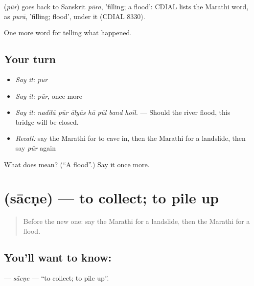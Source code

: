 \begin{cousinweb}
\textbf{} (\emph{pūr}) goes back to Sanskrit \emph{pūra}, 'filling; a flood': CDIAL lists the Marathi word, as \emph{purā}, 'filling; flood', under it (CDIAL 8330).
\end{cousinweb}

\begin{grammarlens}[title={What you've built}]
One more word for telling what happened.
\end{grammarlens}

\subsection*{Your turn}
\begin{itemize}
\raggedright
  \item \emph{Say it:} \emph{pūr}
  \item \emph{Say it:} \emph{pūr}, once more
  \item \emph{Say it:} \emph{nadīlā pūr ālyās hā pūl band hoīl.} — Should the river flood, this bridge will be closed.
  \item \emph{Recall:} say the Marathi for to cave in, then the Marathi for a landslide, then say \emph{pūr} again
\end{itemize}

\begin{tcolorbox}[breakable,colback=teal!4,colframe=teal!35!black,title={Before you move on}]
What does  mean? (\textquotedblleft{}A flood\textquotedblright{}.) Say it once more.
\end{tcolorbox}
\section[\texorpdfstring{\mr{साचणे} (sācṇe)}{साचणे (sācṇe)}]{ (sācṇe) — to collect; to pile up}

\label{lesson:MR-C294-sacne}



\begin{quote}
Before the new one: say the Marathi for a landslide, then the Marathi for a flood.
\end{quote}

\subsection*{You'll want to know: }
\textbf{} — \emph{sācṇe} — \textquotedblleft{}to collect; to pile up\textquotedblright{}.

